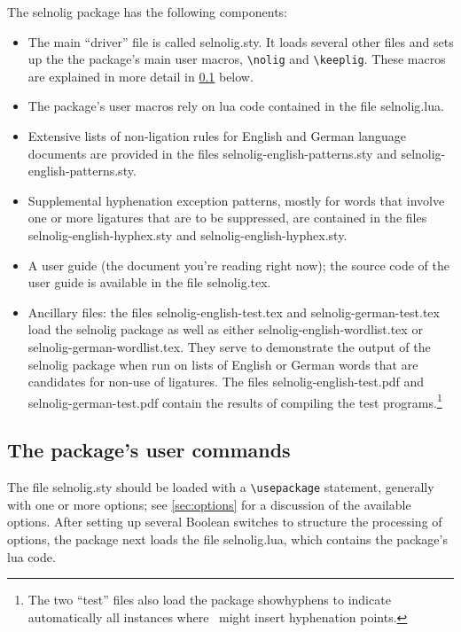 \documentclass[12pt]{article}
\newcommand{\pkg}[1]{\textsf{#1}}
\newcommand{\cmmd}[1]{\texttt{\textbackslash #1}}
\begin{document}
The \pkg{selnolig} package has the following components:
\begin{itemize}
\item The main \enquote{driver} file is called  \pkg{selnolig.sty}. It loads several other files and sets up the the package's main user macros, \cmmd{nolig} and \cmmd{keeplig}. These macros are explained in more detail in \cref{sec:syntax} below.
\item The package's user macros rely on lua code contained in the file \pkg{selnolig.lua}. 
\item Extensive lists of non-ligation rules for English and German language documents are provided in the files \pkg{selnolig-english-patterns.sty} and \pkg{selnolig-english-patterns.sty}. 
\item Supplemental hyphenation exception patterns, mostly for words that involve one or more ligatures that are to be suppressed, are contained in the files \pkg{selnolig-english-hyphex.sty} and \pkg{selnolig-english-hyphex.sty}.
\item A user guide (the document you're reading right now); the source code of the user guide is available in the file \pkg{selnolig.tex}. 

\item Ancillary files: the files \pkg{selnolig-english-test.tex} and \pkg{selnolig-german-test.tex} load the \pkg{selnolig} package as well as either \pkg{selnolig-english-wordlist.tex} or \pkg{selnolig-german-wordlist.tex}. They serve to demonstrate the output of the \pkg{selnolig} package when run on lists of English or German words that are candidates for non-use of ligatures. The files \pkg{selnolig-english-test.pdf} and \pkg{selnolig-german-test.pdf} contain the results of compiling the test programs.\footnote{The two \enquote{test} files also load the package \pkg{showhyphens} to indicate automatically all instances where \LuaLaTeX\ might insert hyphenation points.}

\end{itemize}


\subsection{The package's user commands} \label{sec:syntax}

The file \pkg{selnolig.sty} should be loaded with a \cmmd{usepackage} statement, generally with one or more options; see \cref{sec:options} for a discussion of the available options. After setting up several Boolean switches to structure the processing of options, the package next loads the file \pkg{selnolig.lua}, which contains the package's lua code.  
\end{document}
